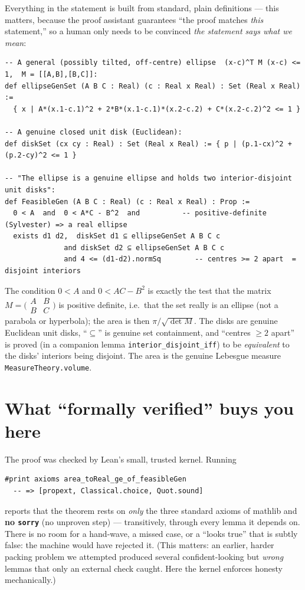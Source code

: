 \documentclass[11pt]{article}
\begin{document}
Everything in the statement is built from standard, plain definitions --- this matters, because the
proof assistant guarantees ``the proof matches \emph{this} statement,'' so a human only needs to be
convinced \emph{the statement says what we mean}:

\begin{lstlisting}[style=lean]
-- A general (possibly tilted, off-centre) ellipse  (x-c)^T M (x-c) <= 1,  M = [[A,B],[B,C]]:
def ellipseGenSet (A B C : Real) (c : Real x Real) : Set (Real x Real) :=
  { x | A*(x.1-c.1)^2 + 2*B*(x.1-c.1)*(x.2-c.2) + C*(x.2-c.2)^2 <= 1 }

-- A genuine closed unit disk (Euclidean):
def diskSet (cx cy : Real) : Set (Real x Real) := { p | (p.1-cx)^2 + (p.2-cy)^2 <= 1 }

-- "The ellipse is a genuine ellipse and holds two interior-disjoint unit disks":
def FeasibleGen (A B C : Real) (c : Real x Real) : Prop :=
  0 < A  and  0 < A*C - B^2  and          -- positive-definite (Sylvester) => a real ellipse
  exists d1 d2,  diskSet d1 ⊆ ellipseGenSet A B C c
              and diskSet d2 ⊆ ellipseGenSet A B C c
              and 4 <= (d1-d2).normSq        -- centres >= 2 apart  =  disjoint interiors
\end{lstlisting}

\noindent The condition $0<A$ and $0<AC-B^2$ is exactly the test that the matrix
$M=\bigl(\begin{smallmatrix}A&B\\B&C\end{smallmatrix}\bigr)$ is positive definite, i.e.\ that the set
really is an ellipse (not a parabola or hyperbola); the area is then $\pi/\sqrt{\det M}$. The disks are
genuine Euclidean unit disks, ``$\subseteq$'' is genuine set containment, and ``centres $\ge 2$ apart''
is proved (in a companion lemma \texttt{interior\_disjoint\_iff}) to be \emph{equivalent} to the disks'
interiors being disjoint. The area is the genuine Lebesgue measure \texttt{MeasureTheory.volume}.

\section{What ``formally verified'' buys you here}

The proof was checked by Lean's small, trusted kernel. Running
\begin{lstlisting}[style=lean]
#print axioms area_toReal_ge_of_feasibleGen
  -- => [propext, Classical.choice, Quot.sound]
\end{lstlisting}
reports that the theorem rests on \emph{only} the three standard axioms of mathlib and \textbf{no
\texttt{sorry}} (no unproven step) --- transitively, through every lemma it depends on. There is no
room for a hand-wave, a missed case, or a ``looks true'' that is subtly false: the machine would have
rejected it. (This matters: an earlier, harder packing problem we attempted produced several
confident-looking but \emph{wrong} lemmas that only an external check caught. Here the kernel enforces
honesty mechanically.)
\end{document}
